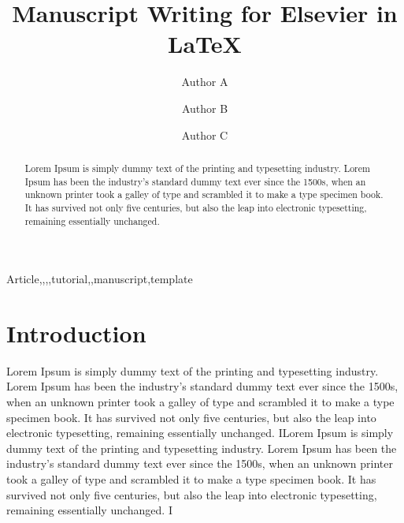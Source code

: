 \documentclass[3p,preprint,authoryear]{elsarticle}
\begin{document}
\begin{frontmatter}


 \title{Manuscript Writing for Elsevier in \LaTeX}
 
 \author[aa]{Author A}
 
 \author[ab]{Author B}
 
 \author[ac]{Author C}

 \address[aa]{Department name-1, institute name-1, place-1, PIN-1,...}
 \address[ab]{Department name-2, institute name-2, place-2, PIN-2,...}
 \address[ac]{Department name-3, institute name-3, place-3, PIN-3,... }

\begin{abstract}
	Lorem Ipsum is simply dummy text of the printing and typesetting industry. Lorem Ipsum has been the industry's standard dummy text ever since the 1500s, when an unknown printer took a galley of type and scrambled it to make a type specimen book. It has survived not only five centuries, but also the leap into electronic typesetting, remaining essentially unchanged. 
\end{abstract}

\begin{keyword}
Article,\sep \LaTeXe,\sep tutorial,\sep manuscript\sep template
\end{keyword}

\end{frontmatter}

\section{Introduction}
Lorem Ipsum is simply dummy text of the printing and typesetting industry. Lorem Ipsum has been the industry's standard dummy text ever since the 1500s, when an unknown printer took a galley of type and scrambled it to make a type specimen book. It has survived not only five centuries, but also the leap into electronic typesetting, remaining essentially unchanged. ILorem Ipsum is simply dummy text of the printing and typesetting industry. Lorem Ipsum has been the industry's standard dummy text ever since the 1500s, when an unknown printer took a galley of type and scrambled it to make a type specimen book. It has survived not only five centuries, but also the leap into electronic typesetting, remaining essentially unchanged. I
\end{document}
